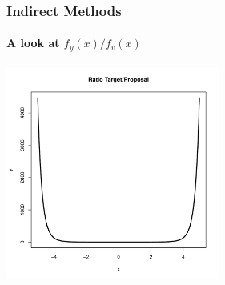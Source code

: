 \documentclass[10pt]{beamer}
\begin{document}
              \begin{frame}
                \frametitle{Indirect Methods}
                \framesubtitle{A look at $f_y(x)/f_v(x)$}

                \begin{center}
                  \includegraphics[height=7cm]{./Pics/rat2.pdf}
                \end{center}
              \end{frame}
\end{document}
